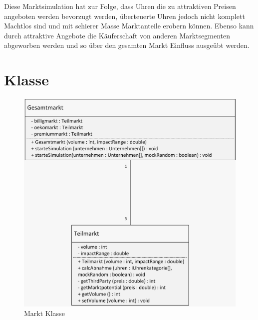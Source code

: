 Diese Marktsimulation hat zur Folge, dass Uhren die zu attraktiven Preisen angeboten werden bevorzugt werden, überteuerte Uhren jedoch nicht komplett Machtlos sind und mit schierer Masse Marktanteile erobern können. Ebenso kann durch attraktive Angebote die Käuferschaft von anderen Marktsegmenten abgeworben werden und so über den gesamten Markt Einfluss ausgeübt werden.

\newpage
\section{Klasse}
\begin{figure} [!h]
	\centering
	\includegraphics[scale=0.3]{img/Markt.jpeg} 
	\caption{Markt Klasse} \label{fig:25}
\end{figure}
